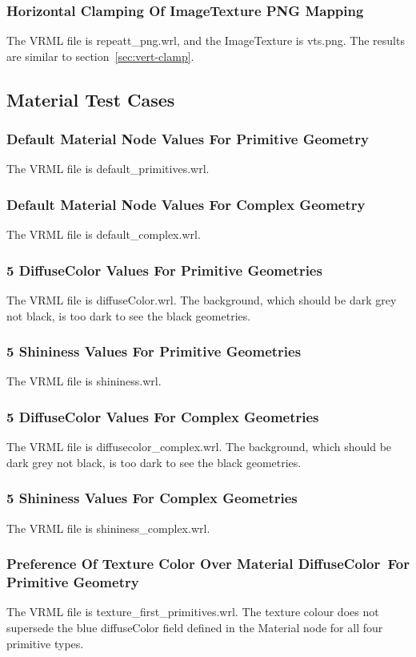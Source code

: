 \documentclass[12pt,letterpaper]{article}
\newcommand{\ITAH}{Horizontal Clamping Of ImageTexture PNG Mapping}
\newcommand{\MatA}{Default Material Node Values For Primitive Geometry}
\newcommand{\MatB}{Default Material Node Values For Complex Geometry}
\newcommand{\MatC}{5 DiffuseColor Values For Primitive Geometries}
\newcommand{\MatD}{5 Shininess Values For Primitive Geometries}
\newcommand{\MatE}{5 DiffuseColor Values For Complex Geometries}
\newcommand{\MatF}{5 Shininess Values For Complex Geometries}
\newcommand{\MatGa}{Preference Of Texture Color Over Material DiffuseColor~}
\newcommand{\MatGb}{For Primitive Geometry}
\begin{document}
\subsubsection{\ITAH}
The VRML file is repeatt\_png.wrl, and the ImageTexture is vts.png.\newline
The results are similar to section~\ref{sec:vert-clamp}.

\subsection{Material Test Cases}

\subsubsection{\MatA}
The VRML file is default\_primitives.wrl.

\subsubsection{\MatB}
The VRML file is default\_complex.wrl.

\subsubsection{\MatC}
The VRML file is diffuseColor.wrl.\newline
The background, which should be dark grey not black, is too dark to see the black geometries.

\subsubsection{\MatD}
The VRML file is shininess.wrl.

\subsubsection{\MatE}
The VRML file is diffusecolor\_complex.wrl.\newline
The background, which should be dark grey not black, is too dark to see the black geometries.

\subsubsection{\MatF}
The VRML file is shininess\_complex.wrl.

\subsubsection{\MatGa \MatGb}
\label{sec:pref-colour}
The VRML file is texture\_first\_primitives.wrl.\newline
The texture colour does not supersede the blue diffuseColor field defined in the Material
node for all four primitive types. 
\end{document}
